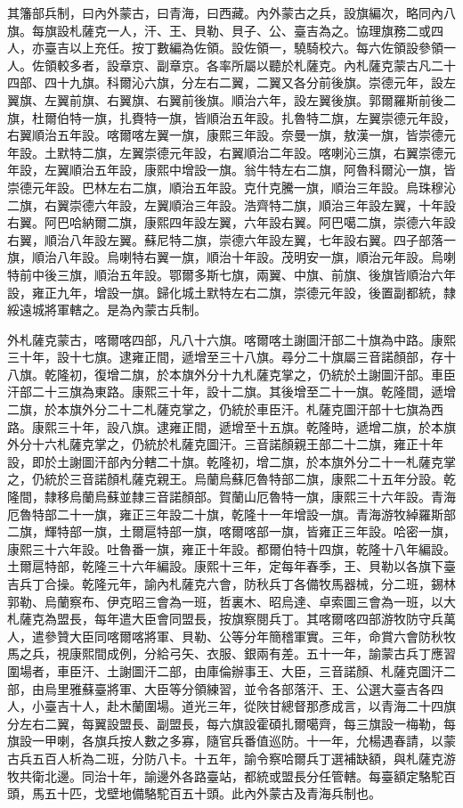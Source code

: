 \begin{pinyinscope}
其籓部兵制，曰內外蒙古，曰青海，曰西藏。內外蒙古之兵，設旗編次，略同內八旗。每旗設札薩克一人，汗、王、貝勒、貝子、公、臺吉為之。協理旗務二或四人，亦臺吉以上充任。按丁數編為佐領。設佐領一，驍騎校六。每六佐領設參領一人。佐領較多者，設章京、副章京。各率所屬以聽於札薩克。內札薩克蒙古凡二十四部、四十九旗。科爾沁六旗，分左右二翼，二翼又各分前後旗。崇德元年，設左翼旗、左翼前旗、右翼旗、右翼前後旗。順治六年，設左翼後旗。郭爾羅斯前後二旗，杜爾伯特一旗，扎賚特一旗，皆順治五年設。扎魯特二旗，左翼崇德元年設，右翼順治五年設。喀爾喀左翼一旗，康熙三年設。奈曼一旗，敖漢一旗，皆崇德元年設。土默特二旗，左翼崇德元年設，右翼順治二年設。喀喇沁三旗，右翼崇德元年設，左翼順治五年設，康熙中增設一旗。翁牛特左右二旗，阿魯科爾沁一旗，皆崇德元年設。巴林左右二旗，順治五年設。克什克騰一旗，順治三年設。烏珠穆沁二旗，右翼崇德六年設，左翼順治三年設。浩齊特二旗，順治三年設左翼，十年設右翼。阿巴哈納爾二旗，康熙四年設左翼，六年設右翼。阿巴噶二旗，崇德六年設右翼，順治八年設左翼。蘇尼特二旗，崇德六年設左翼，七年設右翼。四子部落一旗，順治八年設。烏喇特右翼一旗，順治十年設。茂明安一旗，順治元年設。烏喇特前中後三旗，順治五年設。鄂爾多斯七旗，兩翼、中旗、前旗、後旗皆順治六年設，雍正九年，增設一旗。歸化城土默特左右二旗，崇德元年設，後置副都統，隸綏遠城將軍轄之。是為內蒙古兵制。

外札薩克蒙古，喀爾喀四部，凡八十六旗。喀爾喀土謝圖汗部二十旗為中路。康熙三十年，設十七旗。逮雍正間，遞增至三十八旗。尋分二十旗屬三音諾顏部，存十八旗。乾隆初，復增二旗，於本旗外分十九札薩克掌之，仍統於土謝圖汗部。車臣汗部二十三旗為東路。康熙三十年，設十二旗。其後增至二十一旗。乾隆間，遞增二旗，於本旗外分二十二札薩克掌之，仍統於車臣汗。札薩克圖汗部十七旗為西路。康熙三十年，設八旗。逮雍正間，遞增至十五旗。乾隆時，遞增二旗，於本旗外分十六札薩克掌之，仍統於札薩克圖汗。三音諾顏親王部二十二旗，雍正十年設，即於土謝圖汗部內分轄二十旗。乾隆初，增二旗，於本旗外分二十一札薩克掌之，仍統於三音諾顏札薩克親王。烏蘭烏蘇厄魯特部二旗，康熙二十五年分設。乾隆間，隸移烏蘭烏蘇並隸三音諾顏部。賀蘭山厄魯特一旗，康熙三十六年設。青海厄魯特部二十一旗，雍正三年設二十旗，乾隆十一年增設一旗。青海游牧綽羅斯部二旗，輝特部一旗，土爾扈特部一旗，喀爾喀部一旗，皆雍正三年設。哈密一旗，康熙三十六年設。吐魯番一旗，雍正十年設。都爾伯特十四旗，乾隆十八年編設。土爾扈特部，乾隆三十六年編設。康熙十三年，定每年春季，王、貝勒以各旗下臺吉兵丁合操。乾隆元年，諭內札薩克六會，防秋兵丁各備牧馬器械，分二班，錫林郭勒、烏蘭察布、伊克昭三會為一班，哲裏木、昭烏達、卓索圖三會為一班，以大札薩克為盟長，每年遣大臣會同盟長，按旗察閱兵丁。其喀爾喀四部游牧防守兵萬人，遣參贊大臣同喀爾喀將軍、貝勒、公等分年簡稽軍實。三年，命賞六會防秋牧馬之兵，視康熙間成例，分給弓矢、衣服、銀兩有差。五十一年，諭蒙古兵丁應習圍場者，車臣汗、土謝圖汗二部，由庫倫辦事王、大臣，三音諾顏、札薩克圖汗二部，由烏里雅蘇臺將軍、大臣等分領練習，並令各部落汗、王、公選大臺吉各四人，小臺吉十人，赴木蘭圍場。道光三年，從陜甘總督那彥成言，以青海二十四旗分左右二翼，每翼設盟長、副盟長，每六旗設霍碩扎爾噶齊，每三旗設一梅勒，每旗設一甲喇，各旗兵按人數之多寡，隨官兵番值巡防。十一年，允楊遇春請，以蒙古兵五百人析為二班，分防八卡。十五年，諭令察哈爾兵丁選補缺額，與札薩克游牧共衛北邊。同治十年，諭邊外各路臺站，都統或盟長分任管轄。每臺額定駱駝百頭，馬五十匹，戈壁地備駱駝百五十頭。此內外蒙古及青海兵制也。


\end{pinyinscope}
